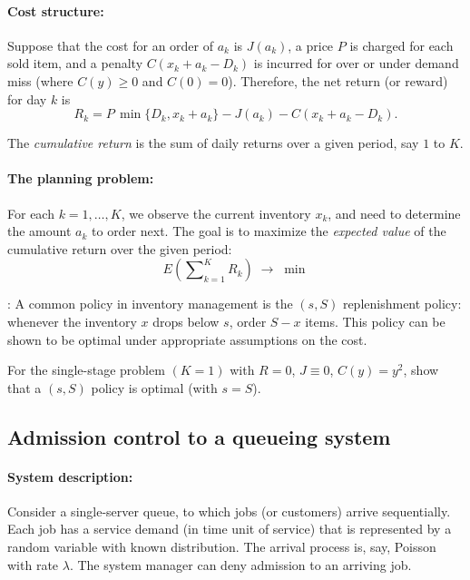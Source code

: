 \paragraph{Cost structure:} Suppose that the cost for an order of $a_k$ is $J(a_k)$, a price $P$ is charged for each sold item, and a penalty $C({x_k} + {a_k} - {D_k})$ is incurred for over or under demand miss (where $C(y) \ge 0$ and  $C(0) = 0$).   Therefore, the net return (or reward) for day $k$ is \[{R_k} = P\,\min \{ {D_k},{x_k} + {a_k}\}  - J({a_k}) - C({x_k} + {a_k} - {D_k}).\]

The \emph{cumulative return} is the sum of daily returns over a given period, say $1$ to $K$.

\paragraph{The planning problem:} For each $k = 1, \ldots ,K$, we observe the current inventory $x_k$, and need to determine the amount $a_k$ to order next. The goal is to maximize the \emph{expected value} of the cumulative return over the given period:
\[E(\sum\nolimits_{k = 1}^K {{R_k}} )\; \to \;\min \]

\begin{remark}: A common policy in inventory management is the $(s,S)$ replenishment policy: whenever the inventory $x$ drops below $s$, order $S-x$ items. This policy can be shown to be optimal under appropriate assumptions on the cost.
\end{remark}
\begin{exercise} For the single-stage problem $(K=1)$  with $R=0$, $J\equiv0$, $C(y)=y^2$, show that a $(s,S)$ policy is optimal (with $s=S$).
\end{exercise}

\subsection{Admission control to a queueing system}
\paragraph{System description:} Consider a single-server queue, to which jobs (or customers) arrive sequentially. Each job has a service demand (in time unit of service) that is represented by a random variable with known distribution. The arrival process is, say, Poisson with rate $\lambda$.  The system manager can deny admission to an arriving job.


